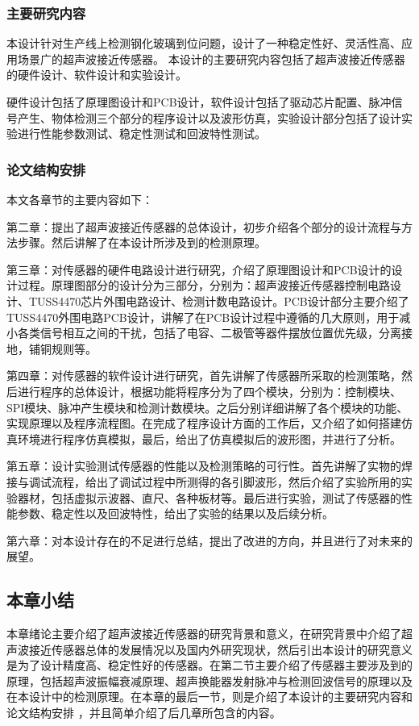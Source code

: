 \subsubsection{主要研究内容}
本设计针对生产线上检测钢化玻璃到位问题，设计了一种稳定性好、灵活性高、应用场景广的超声波接近传感器。
本设计的主要研究内容包括了超声波接近传感器的硬件设计、软件设计和实验设计。\par
硬件设计包括了原理图设计和PCB设计，软件设计包括了驱动芯片配置、脉冲信号产生、物体检测三个部分的程序设计以及波形仿真，实验设计部分包括了设计实验进行性能参数测试、稳定性测试和回波特性测试。

\subsubsection{论文结构安排}
本文各章节的主要内容如下：

第二章：提出了超声波接近传感器的总体设计，初步介绍各个部分的设计流程与方法步骤。然后讲解了在本设计所涉及到的检测原理。

第三章：对传感器的硬件电路设计进行研究，介绍了原理图设计和PCB设计的设计过程。原理图部分的设计分为三部分，分别为：超声波接近传感器控制电路设计、TUSS4470芯片外围电路设计、检测计数电路设计。PCB设计部分主要介绍了TUSS4470外围电路PCB设计，讲解了在PCB设计过程中遵循的几大原则，用于减小各类信号相互之间的干扰，包括了电容、二极管等器件摆放位置优先级，分离接地，铺铜规则等。

第四章：对传感器的软件设计进行研究，首先讲解了传感器所采取的检测策略，然后进行程序的总体设计，根据功能将程序分为了四个模块，分别为：控制模块、SPI模块、脉冲产生模块和检测计数模块。之后分别详细讲解了各个模块的功能、实现原理以及程序流程图。在完成了程序设计方面的工作后，又介绍了如何搭建仿真环境进行程序仿真模拟，最后，给出了仿真模拟后的波形图，并进行了分析。

第五章：设计实验测试传感器的性能以及检测策略的可行性。首先讲解了实物的焊接与调试流程，给出了调试过程中所测得的各引脚波形，然后介绍了实验所用的实验器材，包括虚拟示波器、直尺、各种板材等。最后进行实验，测试了传感器的性能参数、稳定性以及回波特性，给出了实验的结果以及后续分析。

第六章：对本设计存在的不足进行总结，提出了改进的方向，并且进行了对未来的展望。


    \subsection{本章小结}
    本章绪论主要介绍了超声波接近传感器的研究背景和意义，在研究背景中介绍了超声波接近传感器总体的发展情况以及国内外研究现状，然后引出本设计的研究意义是为了设计精度高、稳定性好的传感器。在第二节主要介绍了传感器主要涉及到的原理，包括超声波振幅衰减原理、超声换能器发射脉冲与检测回波信号的原理以及在本设计中的检测原理。在本章的最后一节，则是介绍了本设计的主要研究内容和论文结构安排
    ，并且简单介绍了后几章所包含的内容。